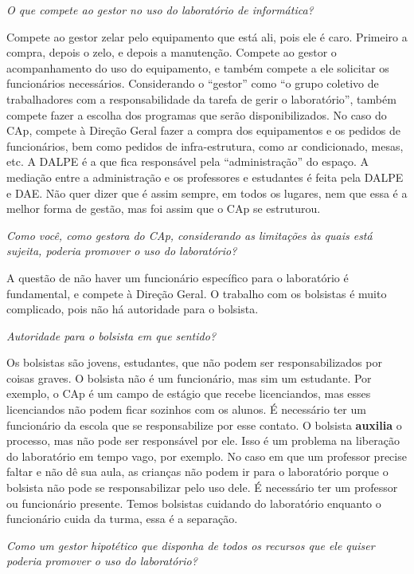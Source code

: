 \textit{O que compete ao gestor no uso do laboratório de informática?}

Compete ao gestor zelar pelo equipamento que está ali, pois ele é caro. Primeiro a compra, depois o zelo, e depois a manutenção. Compete ao gestor o acompanhamento do uso do equipamento, e também compete a ele solicitar os funcionários necessários. Considerando o “gestor” como “o grupo coletivo de trabalhadores com a responsabilidade da tarefa de gerir o laboratório”, também compete fazer a escolha dos programas que serão disponibilizados. No caso do CAp, compete à Direção Geral fazer a compra dos equipamentos e os pedidos de funcionários, bem como pedidos de infra-estrutura, como ar condicionado, mesas, etc. A DALPE é a que fica responsável pela “administração” do espaço. A mediação entre a administração e os professores e estudantes é feita pela DALPE e DAE. Não quer dizer que é assim sempre, em todos os lugares, nem que essa é a melhor forma de gestão, mas foi assim que o CAp se estruturou. 

\textit{Como você, como gestora do CAp, considerando as limitações às quais está sujeita, poderia promover o uso do laboratório?}

A questão de não haver um funcionário específico para o laboratório é fundamental, e compete à Direção Geral. O trabalho com os bolsistas é muito complicado, pois não há autoridade para o bolsista.

\textit{Autoridade para o bolsista em que sentido?}

Os bolsistas são jovens, estudantes, que não podem ser responsabilizados por coisas graves. O bolsista não é um funcionário, mas sim um estudante. Por exemplo, o CAp é um campo de estágio que recebe licenciandos, mas esses licenciandos não podem ficar sozinhos com os alunos. É necessário ter um funcionário da escola que se responsabilize por esse contato. O bolsista \textbf{auxilia} o processo, mas não pode ser responsável por ele. Isso é um problema na liberação do laboratório em tempo vago, por exemplo. No caso em que um professor precise faltar e não dê sua aula, as crianças não podem ir para o laboratório porque o bolsista não pode se responsabilizar pelo uso dele. É necessário ter um professor ou funcionário presente. Temos bolsistas cuidando do laboratório enquanto o funcionário cuida da turma, essa é a separação.

\textit{Como um gestor hipotético que disponha de todos os recursos que ele quiser poderia promover o uso do laboratório?}

